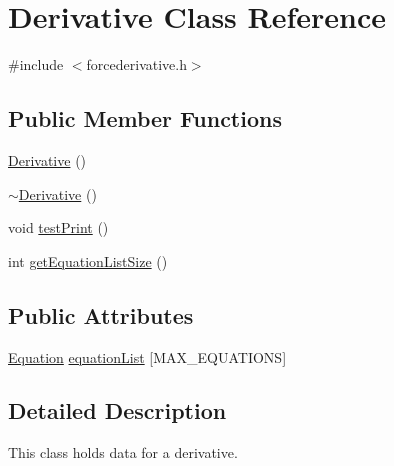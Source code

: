\hypertarget{class_derivative}{\section{Derivative Class Reference}
\label{class_derivative}
}


{\ttfamily \#include $<$forcederivative.\-h$>$}

\subsection*{Public Member Functions}
\begin{DoxyCompactItemize}
\item 
\hyperlink{class_derivative_adc03ec3ad150bc0de66a3e7200cd368f}{Derivative} ()
\item 
\hyperlink{class_derivative_a7fc4ee53f460dfb98b3db2e9c9830cf9}{$\sim$\-Derivative} ()
\item 
void \hyperlink{class_derivative_afe00a18765c0d70c3232a41f5ac663dd}{test\-Print} ()
\item 
int \hyperlink{class_derivative_ac95af6fb993314a578b3f0d3cd57a9cc}{get\-Equation\-List\-Size} ()
\end{DoxyCompactItemize}
\subsection*{Public Attributes}
\begin{DoxyCompactItemize}
\item 
\hyperlink{class_equation}{Equation} \hyperlink{class_derivative_a183278e468ffc4d3313968a01c6770ea}{equation\-List} \mbox{[}M\-A\-X\-\_\-\-E\-Q\-U\-A\-T\-I\-O\-N\-S\mbox{]}
\end{DoxyCompactItemize}


\subsection{Detailed Description}
This class holds data for a derivative. 

